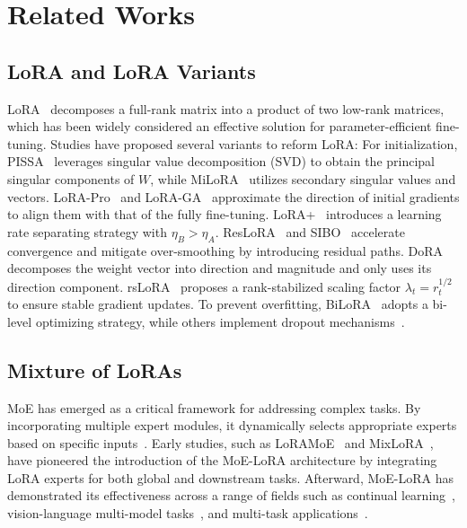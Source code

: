 \section{Related Works}
\subsection{LoRA and LoRA Variants}
LoRA~\cite{lora} decomposes a full-rank matrix into a product of two low-rank matrices, which has been widely considered an effective solution for parameter-efficient fine-tuning. Studies have proposed several variants to reform LoRA: For initialization, PISSA~\cite{pissa} leverages singular value decomposition (SVD) to obtain the principal singular components of $W$, while MiLoRA~\cite{milora} utilizes secondary singular values and vectors. LoRA-Pro~\cite{lorapro} and LoRA-GA~\cite{lora-ga} approximate the direction of initial gradients to align them with that of the fully fine-tuning. LoRA+~\cite{lora+} introduces a learning rate separating strategy with $\eta_B > \eta_A$. ResLoRA~\cite{reslora} and SIBO~\cite{sibo} accelerate convergence and mitigate over-smoothing by introducing residual paths. DoRA~\cite{dora} decomposes the weight vector into direction and magnitude and only uses its direction component. rsLoRA~\cite{rslora} proposes a rank-stabilized scaling factor $\lambda_t = r_t^{1/2}$ to ensure stable gradient updates. To prevent overfitting, BiLoRA~\cite{bilora} adopts a bi-level optimizing strategy, while others implement dropout mechanisms~\cite{hiddenkey, loradropout}.

\subsection{Mixture of LoRAs}
MoE has emerged as a critical framework for addressing complex tasks. By incorporating multiple expert modules, it dynamically selects appropriate experts based on specific inputs~\cite{moe}. Early studies, such as LoRAMoE~\cite{loramoe} and MixLoRA~\cite{mixlora}, have pioneered the introduction of the MoE-LoRA architecture by integrating LoRA experts for both global and downstream tasks. Afterward, MoE-LoRA has demonstrated its effectiveness across a range of fields such as continual learning~\cite{loramoe, yang2024moral}, vision-language multi-model tasks~\cite{mocle, llava}, and multi-task applications~\cite{MOElora}.

